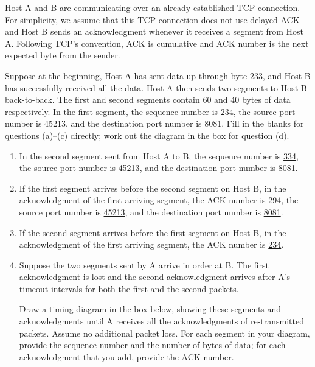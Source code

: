 \documentclass{report}
\begin{document}
\mktitle


\begin{problem}
Host A and B are communicating over an already established TCP connection.
For simplicity, we assume that this TCP connection does not use delayed ACK and Host B sends an acknowledgment whenever it receives a segment from Host A. Following TCP's convention, ACK is cumulative and ACK number is the next expected byte from the sender.

Suppose at the beginning, Host A has sent data up through byte 233, and Host B has successfully received all the data. Host A then sends two segments to Host B back-to-back.
The first and second segments contain 60 and 40 bytes of data respectively.
In the first segment, the sequence number is 234, the source port number is 45213, and the destination port number is 8081.
Fill in the blanks for questions (a)--(c) directly; work out the diagram in the box for question (d).

\begin{enumerate}
  \item In the second segment sent from Host A to B, the sequence number is \underline{334}, the source port number is \underline{45213}, and the destination port number is \underline{8081}.
  \item If the first segment arrives before the second segment on Host B, in the acknowledgment of the first arriving segment, the ACK number is \underline{294}, the source port number is \underline{45213}, and the destination port number is \underline{8081}.
  \item If the second segment arrives before the first segment on Host B, in the acknowledgment of the first arriving segment, the ACK number is \underline{234}.
  \item Suppose the two segments sent by A arrive in order at B.
  The first acknowledgment is lost and the second acknowledgment arrives after A's timeout intervals for both the first and the second packets.
 
  
  Draw a timing diagram in the box below, showing these segments and acknowledgments until A receives all the acknowledgments of re-transmitted packets.
  Assume no additional packet loss.
  For each segment in your diagram, provide the sequence number and the number of bytes of data; for each acknowledgment that you add, provide the ACK number.
\end{enumerate}



\end{problem}
\end{document}
